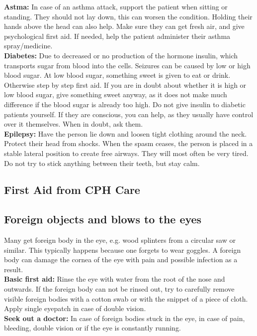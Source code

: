 \documentclass[../../../main.tex]{subfiles}
\begin{document}
\begin{multicols}{2}
\textbf{Astma:} In case of an asthma attack, support the patient when sitting or standing. They should not lay down, this can worsen the condition. Holding their hands above the head can also help. Make sure they can get fresh air, and give psychological first aid. If needed, help the patient administer their asthma spray/medicine.
\\
\textbf{Diabetes:} Due to decreased or no production of the hormone insulin, which transports sugar from blood into the cells. Seizures can be caused by low or high blood sugar. At low blood sugar, something sweet is given to eat or drink. Otherwise step by step first aid. If you are in doubt about whether it is high or low blood sugar, give something sweet anyway, as it does not make much difference if the blood sugar is already too high. Do not give insulin to diabetic patients yourself. If they are conscious, you can help, as they usually have control over it themselves. When in doubt, ask them.
\\
\textbf{Epilepsy:} Have the person lie down and loosen tight clothing around the neck. Protect their head from shocks. When the spasm ceases, the person is placed in a stable lateral position to create free airways. They will most often be very tired. Do not try to stick anything between their teeth, but stay calm.

\clearpage

\subsection{First Aid from CPH Care}

\subsection*{Foreign objects and blows to the eyes} Many get foreign body in the eye, e.g. wood splinters from a circular saw or similar. This typically happens because one forgets to wear goggles. A foreign body can damage the cornea of the eye with pain and possible infection as a result.
\\

\textbf{Basic first aid:}
Rinse the eye with water from the root of the nose and outwards. If the foreign body can not be rinsed out, try to carefully remove visible foreign bodies with a cotton swab or with the snippet of a piece of cloth. Apply single eyepatch in case of double vision.
\\

\textbf{Seek out a doctor:}
In case of foreign bodies stuck in the eye, in case of pain, bleeding, double vision or if the eye is constantly running.
\\


\end{multicols}
\end{document}
